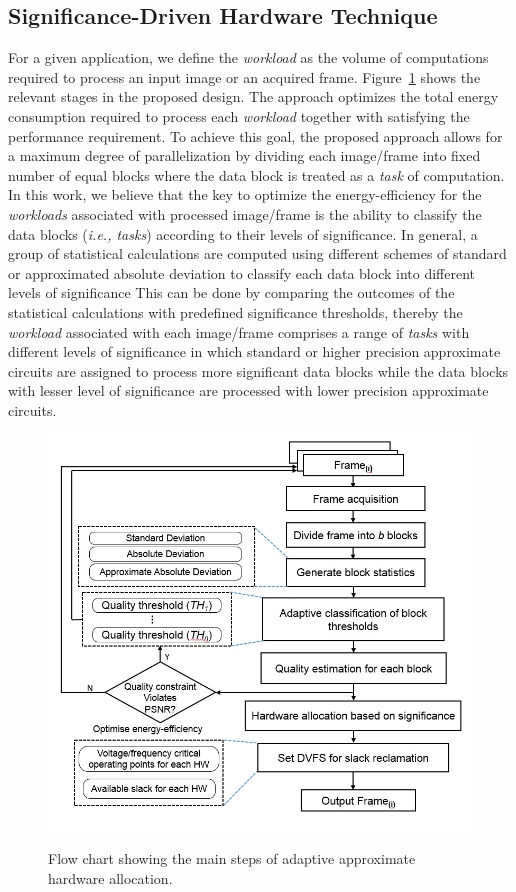 \documentclass[journal]{IEEEtran}
\begin{document}
\subsection{Significance-Driven Hardware Technique}
For a given application, we define the \emph{workload} as the volume of computations required to process an input image or an acquired frame. Figure~\ref{FC} shows the relevant stages in the proposed design. The approach optimizes the total energy consumption required to process each \emph{workload} together with satisfying the performance requirement. To achieve this goal, the proposed approach allows for a maximum degree of parallelization by dividing each image/frame into fixed number of equal blocks where the data block is treated as a \emph{task} of computation. In this work, we believe that the key to optimize the energy-efficiency for the \emph{workloads} associated with processed image/frame is the ability to classify the data blocks (\emph{i.e., tasks}) according to their levels of significance. %
In general, a group of statistical calculations are computed using different schemes of standard or approximated absolute deviation to classify each data block into different levels of significance   %
This can be done by comparing the outcomes of the statistical calculations with predefined significance thresholds, thereby the \emph{workload} associated with each image/frame comprises a range of \emph{tasks} with different levels of significance in which standard or higher precision approximate circuits are assigned to process more significant data blocks while the data blocks with lesser level of significance are processed with lower precision approximate circuits.\\
\begin{figure}[hbtp]
  \centering
    \caption{Flow chart showing the main steps of adaptive approximate hardware allocation.}
    \includegraphics[width=\columnwidth]{Flow_chart.jpg}
\label{FC}
\end{figure}
\end{document}
